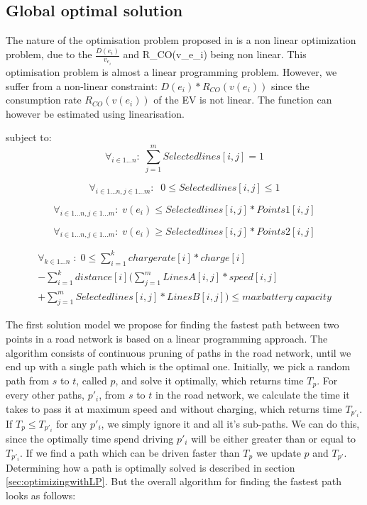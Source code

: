 \subsection{Global optimal solution}
The nature of the optimisation problem proposed in  is a non linear optimization problem, due to the $\frac{D(e_i)}{v_{e_i}}$ and R_{CO}(v_{e_i}) being non linear. 
This optimisation problem is almost a linear programming problem. However, we suffer from a non-linear constraint: $D(e_i)*R_{CO}(v(e_i))$ since the consumption rate $R_{CO}(v(e_i))$ of the EV is not linear. The function can however be estimated using linearisation. 

subject to: 
\begin{equation}
\forall_{i\in1 \dots n }:\; \sum_{j=1}^{m} Selectedlines[i,j] = 1
\end{equation}

\begin{equation}
\forall_{i\in1 \dots n, j \in 1 \dots m}: \; \;0\leq Selectedlines[i,j] \leq 1
\end{equation}

\begin{equation}
\forall_{i\in1 \dots n, j \in 1 \dots m}:\; v(e_i) \le Selectedlines[i,j] * Points1[i,j]
\end{equation}

\begin{equation}
\forall_{i\in1 \dots n, j \in 1 \dots m}:\; v(e_i) \ge Selectedlines[i,j] * Points2[i,j]
\end{equation}

\begin{equation}
\begin{split}
\forall_{k\in1 \dots n}\;:\;0 \le\sum_{i=1}^{k}chargerate[i]*charge[i]\\
-\sum_{i=1}^{k} distance[i](\sum_{j=1}^{m} LinesA[i,j]*speed[i,j]\\
+\sum_{j=1}^{m} Selectedlines[i,j]*LinesB[i,j]) \le maxbattery\;capacity
\end{split}
\end{equation}

The first solution model we propose for finding the fastest path between two points in a road network is based on a linear programming approach. 
The algorithm consists of continuous pruning of paths in the road network, until we end up with a single path which is the optimal one. Initially, we pick a random path from $s$ to $t$, called $p$, and solve it optimally, which returns time $T_p$. For every other paths, $p'_i$, from $s$ to $t$ in the road network, we calculate the time it takes to pass it at maximum speed and without charging, which returns time $T_{p'_{i}}$. If $T_p \leq T_{p'_{i}}$ for any $p'_{i}$, we simply ignore it and all it's sub-paths. We can do this, since the optimally time spend driving $p'_i$ will be either greater than or equal to $T_{p'_{i}}$. If we find a path which can be driven faster than $T_p$ we update $p$ and $T_{p'}$. Determining how a path is optimally solved is described in section \ref{sec:optimizingwithLP}. But the overall algorithm for finding the fastest path looks as follows:\\

